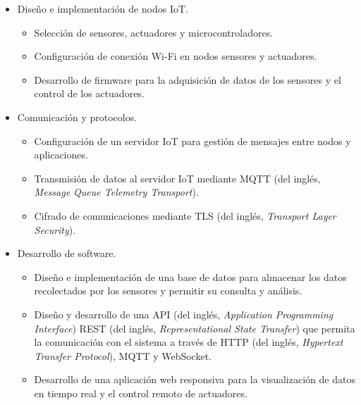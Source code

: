 \begin{itemize}
      \item Diseño e implementación de nodos IoT.
            \begin{itemize}
                  \item Selección de sensores, actuadores y microcontroladores.
                  \item Configuración de conexión Wi-Fi en nodos sensores y actuadores.
                  \item Desarrollo de firmware para la adquisición de datos de los sensores y el
                        control de los actuadores.
            \end{itemize}
\end{itemize}
\begin{itemize}
      \item Comunicación y protocolos.
            \begin{itemize}
                  \item Configuración de un servidor IoT para gestión de mensajes entre nodos y
                        aplicaciones.
                  \item Transmisión de datos al servidor IoT mediante MQTT (del inglés, \textit{Message
                              Queue Telemetry Transport}).
                  \item Cifrado de comunicaciones mediante TLS (del inglés, \textit{Transport Layer
                              Security}).
            \end{itemize}
\end{itemize}
\begin{itemize}
      \item Desarrollo de software.
            \begin{itemize}
                  \item Diseño e implementación de una base de datos para almacenar los datos
                        recolectados por los sensores y permitir su consulta y análisis.
                  \item Diseño y desarrollo de una API (del inglés, \textit{Application Programming
                              Interface}) REST (del inglés, \textit{Representational State Transfer}) que
                        permita la comunicación con el sistema a través de HTTP (del inglés,
                        \textit{Hypertext Transfer Protocol}), MQTT y WebSocket.
                  \item Desarrollo de una aplicación web responsiva para la visualización de datos en
                        tiempo real y el control remoto de actuadores.
            \end{itemize}
\end{itemize}
